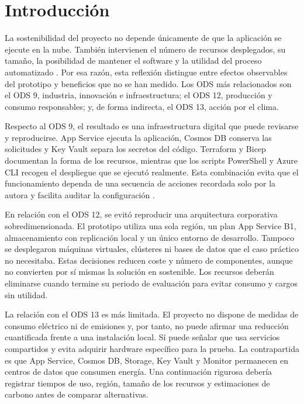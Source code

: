 
\section{Introducción}

La sostenibilidad del proyecto no depende únicamente de que la aplicación se ejecute en la nube. También intervienen el número de recursos desplegados, su tamaño, la posibilidad de mantener el software y la utilidad del proceso automatizado \cite{crue_sostenibilidad_directrices,azure_cloud_adoption_framework}. Por esa razón, esta reflexión distingue entre efectos observables del prototipo y beneficios que no se han medido. Los ODS más relacionados son el ODS 9, industria, innovación e infraestructura; el ODS 12, producción y consumo responsables; y, de forma indirecta, el ODS 13, acción por el clima.

Respecto al ODS 9, el resultado es una infraestructura digital que puede revisarse y reproducirse. App Service ejecuta la aplicación, Cosmos DB conserva las solicitudes y Key Vault separa los secretos del código. Terraform y Bicep documentan la forma de los recursos, mientras que los scripts PowerShell y Azure CLI recogen el despliegue que se ejecutó realmente. Esta combinación evita que el funcionamiento dependa de una secuencia de acciones recordada solo por la autora y facilita auditar la configuración \cite{azure_well_architected}.

En relación con el ODS 12, se evitó reproducir una arquitectura corporativa sobredimensionada. El prototipo utiliza una sola región, un plan App Service B1, almacenamiento con replicación local y un único entorno de desarrollo. Tampoco se desplegaron máquinas virtuales, clústeres ni bases de datos que el caso práctico no necesitaba. Estas decisiones reducen coste y número de componentes, aunque no convierten por sí mismas la solución en sostenible. Los recursos deberán eliminarse cuando termine su periodo de evaluación para evitar consumo y cargos sin utilidad.

La relación con el ODS 13 es más limitada. El proyecto no dispone de medidas de consumo eléctrico ni de emisiones y, por tanto, no puede afirmar una reducción cuantificada frente a una instalación local. Sí puede señalar que usa servicios compartidos y evita adquirir hardware específico para la prueba. La contrapartida es que App Service, Cosmos DB, Storage, Key Vault y Monitor permanecen en centros de datos que consumen energía. Una continuación rigurosa debería registrar tiempos de uso, región, tamaño de los recursos y estimaciones de carbono antes de comparar alternativas.

